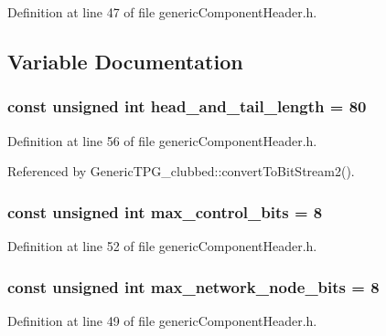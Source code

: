 Definition at line 47 of file genericComponentHeader.h.

\subsection{Variable Documentation}
\subsubsection[{head\_\-and\_\-tail\_\-length}]{\setlength{\rightskip}{0pt plus 5cm}const unsigned int {\bf head\_\-and\_\-tail\_\-length} = 80}\label{genericComponentHeader_8h_8dbcbbf46fb808cab854d20ce33645d5}




Definition at line 56 of file genericComponentHeader.h.

Referenced by GenericTPG\_\-clubbed::convertToBitStream2().
\subsubsection[{max\_\-control\_\-bits}]{\setlength{\rightskip}{0pt plus 5cm}const unsigned int {\bf max\_\-control\_\-bits} = 8}\label{genericComponentHeader_8h_3c2da81fd84ab0358092e3b47aac3b3c}




Definition at line 52 of file genericComponentHeader.h.
\subsubsection[{max\_\-network\_\-node\_\-bits}]{\setlength{\rightskip}{0pt plus 5cm}const unsigned int {\bf max\_\-network\_\-node\_\-bits} = 8}\label{genericComponentHeader_8h_a11688d7b68d9e3b60784e388b3a94c8}




Definition at line 49 of file genericComponentHeader.h.

